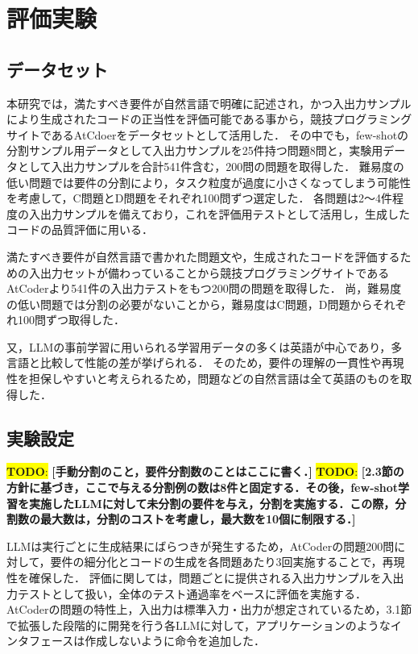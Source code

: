 \documentclass[submit,techrep,noauthor]{ipsj}
\newcommand{\todo}[1]{\colorbox{yellow}{{\bf TODO}:}{\color{red} {\textbf{[#1]}}}}
\begin{document}
\section{評価実験}
\label{sec:evaluation}

\subsection{データセット}
本研究では，満たすべき要件が自然言語で明確に記述され，かつ入出力サンプルにより生成されたコードの正当性を評価可能である事から，競技プログラミングサイトであるAtCdoerをデータセットとして活用した．
その中でも，few-shotの分割サンプル用データとして入出力サンプルを25件持つ問題8問と，実験用データとして入出力サンプルを合計541件含む，200問の問題を取得した．
難易度の低い問題では要件の分割により，タスク粒度が過度に小さくなってしまう可能性を考慮して，C問題とD問題をそれぞれ100問ずつ選定した．
各問題は2〜4件程度の入出力サンプルを備えており，これを評価用テストとして活用し，生成したコードの品質評価に用いる．

満たすべき要件が自然言語で書かれた問題文や，生成されたコードを評価するための入出力セットが備わっていることから競技プログラミングサイトであるAtCoder\cite{AtCoder}より541件の入出力テストをもつ200問の問題を取得した．
尚，難易度の低い問題では分割の必要がないことから，難易度はC問題，D問題からそれぞれ100問ずつ取得した．

又，LLMの事前学習に用いられる学習用データの多くは英語が中心であり，多言語と比較して性能の差が挙げられる．\cite{LLM_En} 
そのため，要件の理解の一貫性や再現性を担保しやすいと考えられるため，問題などの自然言語は全て英語のものを取得した．

\subsection{実験設定}
\todo{手動分割のこと，要件分割数のことはここに書く．}
\todo{2.3節の方針に基づき，ここで与える分割例の数は8件と固定する．その後，few-shot学習を実施したLLMに対して未分割の要件を与え，分割を実施する．この際，分割数の最大数は，分割のコストを考慮し，最大数を10個に制限する．}

LLMは実行ごとに生成結果にばらつきが発生するため，AtCoderの問題200問に対して，要件の細分化とコードの生成を各問題あたり3回実施することで，再現性を確保した．
評価に関しては，問題ごとに提供される入出力サンプルを入出力テストとして扱い，全体のテスト通過率をベースに評価を実施する．
AtCoderの問題の特性上，入出力は標準入力・出力が想定されているため，3.1節で拡張した段階的に開発を行う各LLMに対して，アプリケーションのようなインタフェースは作成しないように命令を追加した．
\end{document}
